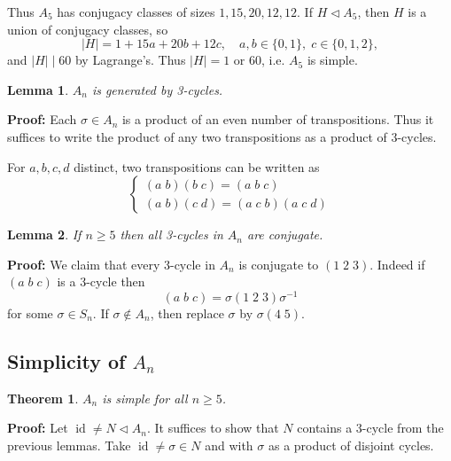 \documentclass[12pt]{article}
\DeclareMathOperator{\id}{id}
\newtheorem{theorem}{Theorem}[section]
\newtheorem{lemma}{Lemma}[section]
\theoremstyle{definition}
\theoremstyle{remark}
\begin{document}
Thus $A_5$ has conjugacy classes of sizes $1, 15, 20, 12, 12$. If $H \lhd A_5$, then $H$ is a union of conjugacy classes, so
\[
	|H| = 1 + 15a + 20b + 12c, \quad a, b \in \{0, 1\}, \; c \in \{0, 1, 2\}
,\]
and $|H| \mid 60$ by Lagrange's. Thus $|H| = 1$ or 60, i.e. $A_5$ is simple.

\begin{lemma}
	$A_n$ is generated by 3-cycles.
\end{lemma}

\begin{adjustbox}{minipage = \columnwidth - 25.5pt, margin=1em, frame=1pt, margin=0em}
\textbf{Proof:} Each $\sigma \in A_n$ is a product of an even number of transpositions. Thus it suffices to write the product of any two transpositions as a product of 3-cycles.

For $a, b, c, d$ distinct, two transpositions can be written as
\[
\begin{cases}
	(a\; b)(b\; c) = (a\; b\; c) \\
	(a\; b)(c\; d) = (a\; c\; b)(a\; c\; d)
\end{cases}
\]

\end{adjustbox}

\begin{lemma}
	If $n \geq 5$ then all 3-cycles in $A_n$ are conjugate.
\end{lemma}

\begin{adjustbox}{minipage = \columnwidth - 25.5pt, margin=1em, frame=1pt, margin=0em}
\textbf{Proof:} We claim that every 3-cycle in $A_n$ is conjugate to $(1\; 2\; 3)$. Indeed if $(a\; b\; c)$ is a 3-cycle then
\[
	(a\; b\; c) = \sigma(1\; 2\; 3)\sigma^{-1}
\]
for some $\sigma \in S_n$. If $\sigma \not \in A_n$, then replace $\sigma$ by $\sigma(4\; 5)$.

\end{adjustbox}


\subsection{Simplicity of \texorpdfstring{$A_n$}{An}}%
\label{sub:simplicity_of_a_n_}

\begin{theorem}
	$A_n$ is simple for all $n \geq 5$.
\end{theorem}

\textbf{Proof:} Let $\id \neq N \lhd A_n$. It suffices to show that $N$ contains a 3-cycle from the previous lemmas. Take $\id \neq \sigma \in N$ and with $\sigma$ as a product of disjoint cycles.
\end{document}
